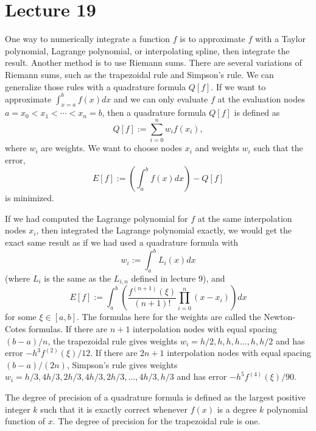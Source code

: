 \documentclass{article}
\begin{document}
\section{Lecture 19}
One way to numerically integrate a function $f$ is to approximate $f$ with a Taylor polynomial, Lagrange polynomial, or interpolating spline, then integrate the result. Another method is to use Riemann sums. There are several variations of Riemann sums, such as the trapezoidal rule and Simpson's rule. We can generalize those rules with a quadrature formula $Q[f]$. If we want to approximate $\int_{x=a}^b f(x) dx$ and we can only evaluate $f$ at the evaluation nodes $a=x_0 < x_1 < \cdots < x_n=b$, then a quadrature formula $Q[f]$ is defined as
\[ Q[f] := \sum_{i=0}^n w_i f(x_i), \]
where $w_i$ are weights. We want to choose nodes $x_i$ and weights $w_i$ such that the error,
\[ E[f] := \left( \int_a^b f(x)dx \right) -Q[f] \]
is minimized.
\par
If we had computed the Lagrange polynomial for $f$ at the same interpolation nodes $x_i$, then integrated the Lagrange polynomial exactly, we would get the exact same result as if we had used a quadrature formula with
\[ w_i := \int_a^b L_i(x) dx \]
(where $L_i$ is the same as the $L_{i,n}$ defined in lecture 9), and
\[ E[f]:= \int_a^b \left( \frac{f^{(n+1)}(\xi)}{(n+1)!} \prod_{i=0}^n (x-x_i) \right) dx\]
for some $\xi \in [a,b]$. The formulas here for the weights are called the Newton-Cotes formulas. If there are $n+1$ interpolation nodes with equal spacing $(b-a)/n$, the trapezoidal rule gives weights $w_i = h/2, h, h, h \dots, h, h/2$ and has error $-h^3 f^{(2)}(\xi)/12$. If there are $2n+1$ interpolation nodes with equal spacing $(b-a)/(2n)$, Simpson's rule gives weights $w_i = h/3, 4h/3, 2h/3, 4h/3, 2h/3, \dots, 4h/3, h/3$ and has error $-h^5f^{(4)}(\xi)/90$.
\par
The degree of precision of a quadrature formula is defined as the largest positive integer $k$ such that it is exactly correct whenever $f(x)$ is a degree $k$ polynomial function of $x$. The degree of precision for the trapezoidal rule is one.
\end{document}
